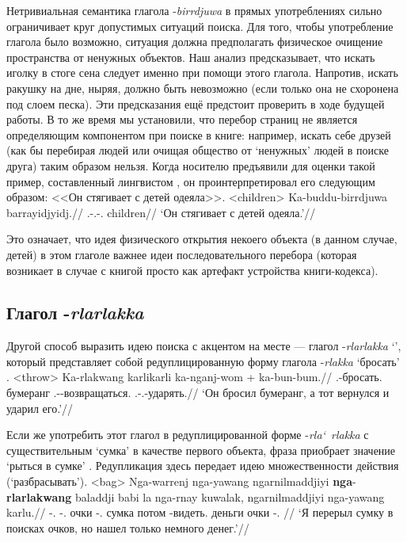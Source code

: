 Нетривиальная семантика глагола -\textit{birrdjuwa} в прямых употреблениях сильно ограничивает круг допустимых ситуаций поиска. Для того, чтобы употребление глагола было возможно, ситуация должна предполагать физическое очищение пространства от ненужных объектов. %
Наш анализ предсказывает, что искать иголку в стоге сена следует именно при помощи этого глагола. Напротив, искать ракушку на дне, ныряя, должно быть невозможно (если только она не схоронена под слоем песка). Эти предсказания ещё предстоит проверить в ходе будущей работы. В то же время мы установили, что перебор страниц не является определяющим компонентом при поиске в книге: например, искать себе друзей (как бы перебирая людей или очищая общество от `ненужных' людей в поиске друга) таким образом нельзя. Когда носителю предъявили для оценки такой пример, составленный лингвистом , %
он проинтерпретировал его следующим образом: <<Он стягивает с детей одеяла>>.
\ex<children>\begingl
\gla Ka-buddu-birrdjuwa barrayidjyidj.//
\glb \Tsg.\Real-\Tpl.\Obj-\bdj.\Np{} children//
\glft `Он стягивает с детей одеяла.'//%
\endgl\xe

Это означает, что идея физического открытия некоего объекта (в данном случае, детей)  в этом глаголе важнее идеи последовательного перебора (которая возникает в случае с книгой просто как артефакт устройства книги-кодекса).
\subsection{Глагол -\textit{rlarlakka}}
\label{sec:rlakka}
Другой способ выразить идею поиска с акцентом на месте --- глагол -\textit{rlarlakka} `\rlk', который представляет собой редуплицированную форму глагола -\textit{rlakka} `бросать' .
\ex<throw>\begingl
\gla Ka-rlakwang karlikarli ka-nganj-wom + ka-bun-bum.//
\glb \Tsg.\Real-бросать.\Pst{} бумеранг \Tsg.\Real-\Hith-возвращаться.\Pst{} \Tsg.\Real-\Tsg.\Obj-ударять.\Pst{}//
\glft `Он бросил бумеранг, а тот вернулся и ударил его.'//%
\endgl\xe

Если же употребить этот глагол в редуплицированной форме -\textit{rla\char`~rlakka} с существительным `сумка' в качестве первого объекта, фраза приобрает значение `рыться в сумке' . Редупликация здесь передает идею множественности действия (`разбрасывать').
\ex<bag>\begingl
\gla Nga-warrenj nga-yawang ngarnilmaddjiyi \textbf{nga}-\textbf{rlarlakwang} baladdji babi la nga-rnay kuwalak, ngarnilmaddjiyi nga-yawang karlu.//
\glb \nga-\warre.\Pst{} \nga-\yaw.\Pst{} очки \nga-\rlk.\Pst{} сумка потом \la{} \nga-видеть.\Pst{} деньги очки \nga-\yaw.\Pst{} \karlu{}//
\glft `Я перерыл сумку в поисках очков, но нашел только немного денег.'//%
\endgl\xe

